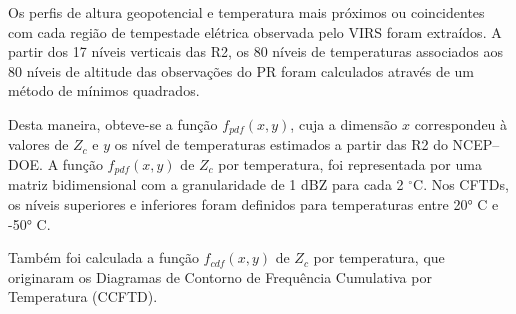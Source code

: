 Os perfis de altura geopotencial e temperatura mais próximos ou coincidentes com cada região de tempestade elétrica observada pelo VIRS foram extraídos. A partir dos 17 níveis verticais das R2, os 80 níveis de temperaturas associados aos 80 níveis de altitude das observações do PR foram calculados através de um método de mínimos quadrados.

Desta maneira, obteve-se a função $f_{pdf}(x,y)$, cuja a dimensão $x$ correspondeu à valores de $Z_{c}$ e $y$ os nível de temperaturas estimados a partir das R2 do NCEP--DOE. A função $f_{pdf}(x,y)$ de $Z_c$ por temperatura, foi representada por uma matriz bidimensional com a granularidade de 1 dBZ para cada 2 $^{\circ}$C. Nos CFTDs, os níveis superiores e inferiores foram definidos para temperaturas entre 20° C e -50° C.



Também foi calculada a função $f_{cdf}(x,y)$ de $Z_c$ por temperatura, que originaram os Diagramas de Contorno de Frequência Cumulativa por Temperatura (CCFTD).     

